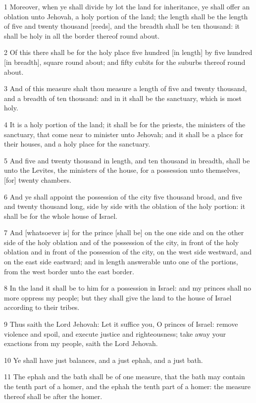 \par 1 Moreover, when ye shall divide by lot the land for inheritance, ye shall offer an oblation unto Jehovah, a holy portion of the land; the length shall be the length of five and twenty thousand [reeds], and the breadth shall be ten thousand: it shall be holy in all the border thereof round about.
\par 2 Of this there shall be for the holy place five hundred [in length] by five hundred [in breadth], square round about; and fifty cubits for the suburbs thereof round about.
\par 3 And of this measure shalt thou measure a length of five and twenty thousand, and a breadth of ten thousand: and in it shall be the sanctuary, which is most holy.
\par 4 It is a holy portion of the land; it shall be for the priests, the ministers of the sanctuary, that come near to minister unto Jehovah; and it shall be a place for their houses, and a holy place for the sanctuary.
\par 5 And five and twenty thousand in length, and ten thousand in breadth, shall be unto the Levites, the ministers of the house, for a possession unto themselves, [for] twenty chambers.
\par 6 And ye shall appoint the possession of the city five thousand broad, and five and twenty thousand long, side by side with the oblation of the holy portion: it shall be for the whole house of Israel.
\par 7 And [whatsoever is] for the prince [shall be] on the one side and on the other side of the holy oblation and of the possession of the city, in front of the holy oblation and in front of the possession of the city, on the west side westward, and on the east side eastward; and in length answerable unto one of the portions, from the west border unto the east border.
\par 8 In the land it shall be to him for a possession in Israel: and my princes shall no more oppress my people; but they shall give the land to the house of Israel according to their tribes.
\par 9 Thus saith the Lord Jehovah: Let it suffice you, O princes of Israel: remove violence and spoil, and execute justice and righteousness; take away your exactions from my people, saith the Lord Jehovah.
\par 10 Ye shall have just balances, and a just ephah, and a just bath.
\par 11 The ephah and the bath shall be of one measure, that the bath may contain the tenth part of a homer, and the ephah the tenth part of a homer: the measure thereof shall be after the homer.
